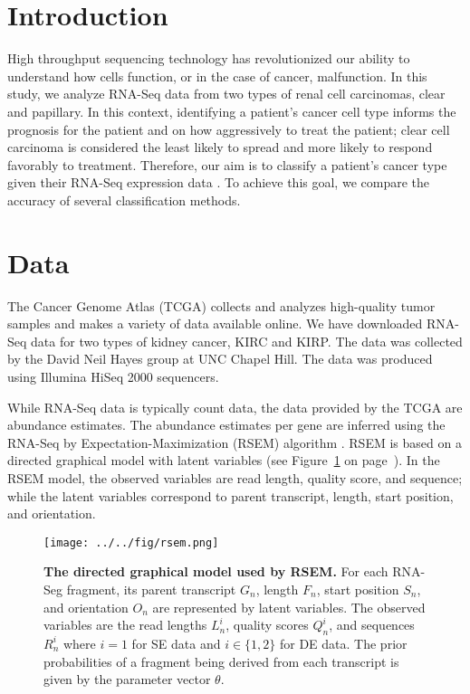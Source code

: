 \section{Introduction}

High throughput sequencing technology has revolutionized our ability to
understand how cells function, or in the case of cancer, malfunction. In this
study, we analyze RNA-Seq data from two types of renal cell carcinomas, clear
and papillary.  In this context, identifying a patient's cancer cell type
informs the prognosis for the patient and on how aggressively to treat the
patient; clear cell carcinoma is considered the least likely to spread and more
likely to respond favorably to treatment. Therefore, our aim is to classify a
patient's cancer type given their RNA-Seq expression data \cite{dudoitclass}.
To achieve this goal, we compare the accuracy of several classification
methods.

\section{Data}

The Cancer Genome Atlas (TCGA) collects and analyzes high-quality tumor samples
and makes a variety of data available online. We have downloaded RNA-Seq data
for two types of kidney cancer, KIRC and KIRP. The data was collected by the
David Neil Hayes group at UNC Chapel Hill. The data was produced using Illumina
HiSeq 2000 sequencers. 

While RNA-Seq data is typically count data, the data provided by the TCGA are
abundance estimates.  The abundance estimates per gene are inferred using the
RNA-Seq by Expectation-Maximization (RSEM) algorithm \cite{li2011rsem}.  RSEM
is based on a directed graphical model with latent variables (see
Figure~\ref{fig:rsem} on page~\pageref{fig:rsem}). In the RSEM model, the
observed variables are read length, quality score, and sequence; while the
latent variables correspond to parent transcript, length, start position, and
orientation.

\begin{figure}[H]
  \centering
    \texttt{[image: ../../fig/rsem.png]}
\caption{\textbf{The directed graphical model used by RSEM.} 
For each RNA-Seg fragment,
its parent transcript $G_n$, length $F_n$, start position  $S_n$, and orientation $O_n$
are represented by latent variables. The observed variables are the read lengths
$L_n^i$, quality scores $Q_n^i$, and sequences $R_n^i$ where $i = 1$ for SE data and
$i \in \{1,2\}$ for DE data. The prior probabilities of a
fragment being derived from each transcript is given by the parameter vector $\theta$.}
   \label{fig:rsem}
\end{figure}

